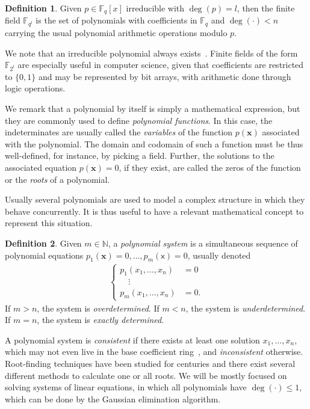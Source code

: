 \documentclass[draft, 12pt, a4paper, oneside]{memoir}
\theoremstyle{definition}
\newtheorem{definition}{Definition}[section]
\theoremstyle{remark}
\begin{document}
\begin{definition}
  Given $p \in \mathbb{F}_{q}[x]$ irreducible with $\deg(p) = l$, then the finite field $\mathbb{F}_{q^{l}}$ is the set of polynomials with coefficients in $\mathbb{F}_{q}$ and $\deg(\cdot) < n$ carrying the usual polynomial arithmetic operations modulo $p$.
\end{definition}

We note that an irreducible polynomial always exists~\cite{}. Finite fields of the form $\mathbb{F}_{2^{l}}$ are especially useful in computer science, given that coefficients are restricted to $\{0, 1\}$ and may be represented by bit arrays, with arithmetic done through logic operations.

We remark that a polynomial by itself is simply a mathematical expression, but they are commonly used to define \emph{polynomial functions}. In this case, the indeterminates are usually called the \emph{variables} of the function $p(\textbf{x})$ associated with the polynomial. The domain and codomain of such a function must be thus well-defined, for instance, by picking a field. Further, the solutions to the associated equation $p(\textbf{x}) = 0$, if they exist, are called the zeros of the function or the \emph{roots} of a polynomial. 

Usually several polynomials are used to model a complex structure in which they behave concurrently. It is thus useful to have a relevant mathematical concept to represent this situation.

\begin{definition}
  Given $m \in \mathbb{N}$, a \emph{polynomial system} is a simultaneous sequence of polynomial equations $p_{1}(\textbf{x}) = 0, \dots, p_{m}(\textsf{x}) = 0$, usually denoted
  \begin{align*}
    \begin{cases}
      p_{1}(x_{1}, \dots, x_{n}) &= 0 \\
      \quad \vdots \\
      p_{m}(x_{1}, \dots, x_{n}) &= 0.
    \end{cases}
  \end{align*}
  If $m > n$, the system is \emph{overdetermined}. If $m < n$, the system is \emph{underdetermined}. If $m = n$, the system is \emph{exactly determined}.
\end{definition}

A polynomial system is \emph{consistent} if there exists at least one solution $x_{1}, \dots, x_{n}$, which may not even live in the base coefficient ring~\cite{}, and \emph{inconsistent} otherwise. Root-finding techniques have been studied for centuries and there exist several different methods to calculate one or all roots. We will be mostly focused on solving systems of linear equations, in which all polynomials have $\deg(\cdot) \leq 1$, which can be done by the Gaussian elimination algorithm.
\end{document}
